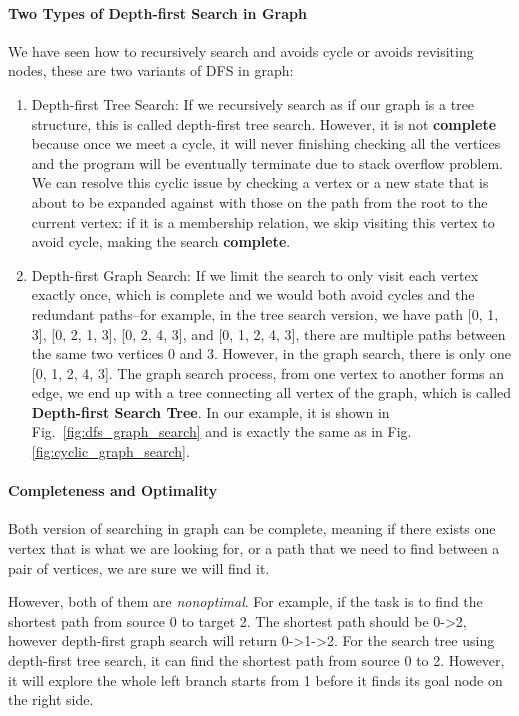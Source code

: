 \documentclass[main.tex]{subfiles}
\begin{document}
\paragraph{Two Types of Depth-first Search in Graph} We have seen how to recursively search and avoids cycle or avoids revisiting nodes, these are two variants of DFS in graph:
\begin{enumerate}
    \item Depth-first Tree Search: If we recursively search as if our graph is a tree structure, this is called depth-first tree search. However, it is not \textbf{complete} because once we meet a cycle, it will never finishing checking all the vertices and the program will be eventually terminate due to stack overflow problem. We can resolve this cyclic issue by checking a vertex or a new state that is about to be expanded against with those on the path from the root to the current vertex: if it is a membership relation, we skip visiting this vertex to avoid cycle, making the search \textbf{complete}.
    \item Depth-first Graph Search: If we limit the search to only visit each vertex exactly once, which is complete and we would both avoid cycles and the redundant paths--for example, in the tree search version, we have path [0, 1, 3], [0, 2, 1, 3], [0, 2, 4, 3], and [0, 1, 2, 4, 3], there are multiple paths between the same two vertices 0 and 3. However, in the graph search, there is only one [0, 1, 2, 4, 3]. The graph search process, from one vertex to another forms an edge, we end up with a tree connecting all vertex of the graph, which is called \textbf{Depth-first Search Tree}. In our example, it is shown in Fig.~\ref{fig:dfs_graph_search} and is exactly the same as in Fig.\ref{fig:cyclic_graph_search}. 
\end{enumerate}
\paragraph{Completeness and Optimality} Both version of searching in graph can be complete, meaning if there exists one vertex that is what we are looking for, or a path that we need to find between a pair of vertices, we are sure we will find it.

However, both of them are \textit{nonoptimal}. For example, if the task is to find the shortest path from source 0 to target 2. The shortest path should be 0->2, however depth-first graph search will return 0->1->2. For the search tree using depth-first tree search, it can find the shortest path from source 0 to 2. However, it will explore the whole left branch starts from 1 before it finds its goal node on the right side. 
\end{document}
